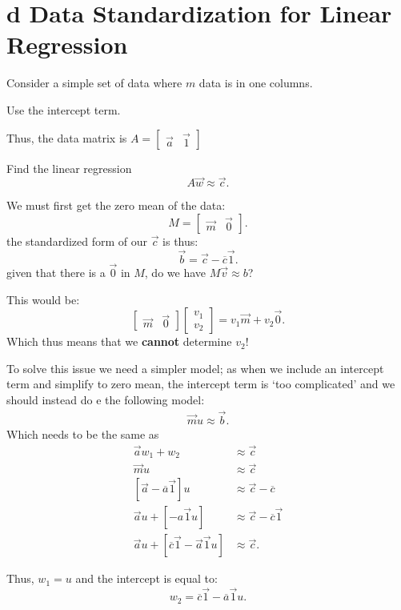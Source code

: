 \documentclass[12pt]{book}
\begin{document}
\section*{d Data Standardization for Linear Regression}
Consider a simple set of data where $m$ data is in one columns.

Use the intercept term.

                        Thus, the data matrix is $A=\begin{bmatrix} \vec a & \vec 1 \end{bmatrix} $

Find the linear regression 
 \[
A\vec w \approx \vec c
.\] 

We must first get the zero mean of the data:
\[
        M = \begin{bmatrix} \vec m & \vec 0 \end{bmatrix} 
.\] 
the standardized form of our $\vec c$ is thus:
 \[
\vec b = \vec c - \overline{c}\vec 1
.\] 
given that there is a $\vec 0$ in  $M$, do we have  $M\vec v \approx b$?

This would be:
 \[
         \begin{bmatrix} \vec m & \vec 0 \end{bmatrix} \begin{bmatrix} v_1 \\ v_2 \end{bmatrix}  = v_1\vec m+v_2 \vec 0
.\] 
Which thus means that we \textbf{cannot} determine $v_2$!
\pagebreak


To solve this issue we need a simpler model; as when we include an intercept term and simplify to zero mean,
        the intercept term is `too complicated' and we should instead do e the following model:
\begin{align*}
        \vec m u \approx \vec b
.\end{align*}
Which needs to be the same as
\begin{align*}
        \vec a w_1 + w_2 &\approx \vec c\\
        \vec m u &\approx \vec c\\
        [\vec a - \overline{a}\vec 1]u &\approx \vec c - \overline{c} \\
        \vec a u +[-a\vec 1 u]&\approx \vec c - \overline{c}\vec 1\\
        \vec a u+[\overline{c}\vec 1-\vec a\vec 1 u]&\approx \vec c
.\end{align*}
 
Thus, $w_1 = u$ and the intercept is equal to:
\[
w_2 = \overline{c}\vec 1 - \overline{a}\vec 1 u
.\] 
\end{document}
